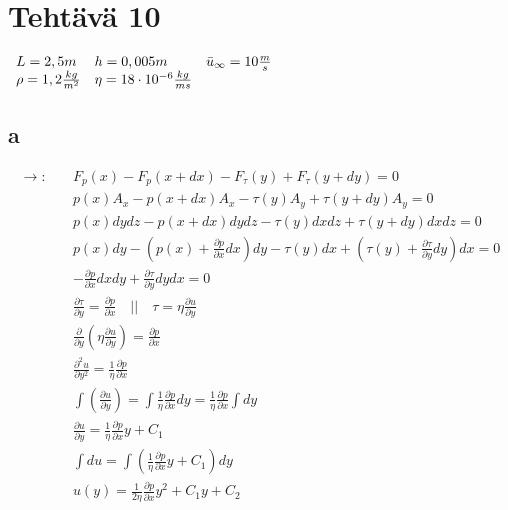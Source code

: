 \documentclass[12pt,a4paper,finnish]{article}
\begin{document}
\section{Tehtävä 10}

\begin{math}
 \begin{array}{l l l}
  L = 2,5 m & h = 0,005m & \bar{u}_{\infty} = 10\frac{m}{s}\\ 
  \rho = 1,2 \frac{kg}{m^2} & \eta = 18\cdot10^{-6}\frac{kg}{ms}
 \end{array}
\end{math}

\subsection{a}

\begin{align}
 \rightarrow: \quad &F_p(x) - F_p(x + dx) - F_{\tau}(y) + F_{\tau}(y + dy) = 0\\
 &p(x)A_x - p(x + dx)A_x - \tau(y)A_y + \tau(y + dy)A_y = 0\\
 &p(x)dydz - p(x + dx)dydz - \tau(y)dxdz + \tau(y + dy)dxdz = 0\\
 &p(x)dy - \left(p(x) + \frac{\partial p}{\partial x}dx\right)dy - 
  \tau(y)dx + \left(\tau(y) + \frac{\partial \tau}{\partial y}dy\right)dx = 0\\
 &-\frac{\partial p}{\partial x}dxdy +\frac{\partial \tau}{\partial y}dydx = 0\\
 &\frac{\partial \tau}{\partial y} = \frac{\partial p}{\partial x}
   \quad \bigg|\bigg| \quad \tau = \eta\frac{\partial u}{\partial y}\\
 &\frac{\partial}{\partial y}\left(\eta\frac{\partial u}{\partial y}\right) = \frac{\partial p}{\partial x}\\
 &\frac{\partial^2 u}{\partial y^2} = \frac{1}{\eta}\frac{\partial p}{\partial x}\\
 &\int\left(\frac{\partial u}{\partial y}\right) = \int\frac{1}{\eta}\frac{\partial p}{\partial x}dy 
  = \frac{1}{\eta}\frac{\partial p}{\partial x}\int dy \\
 &\frac{\partial u}{\partial y} = \frac{1}{\eta}\frac{\partial p}{\partial x}y + C_1\\
 &\int du = \int\left(\frac{1}{\eta}\frac{\partial p}{\partial x}y + C_1\right)dy\\
 &u(y) = \frac{1}{2\eta}\frac{\partial p}{\partial x}y^2 + C_1y + C_2
\end{align}
\end{document}
